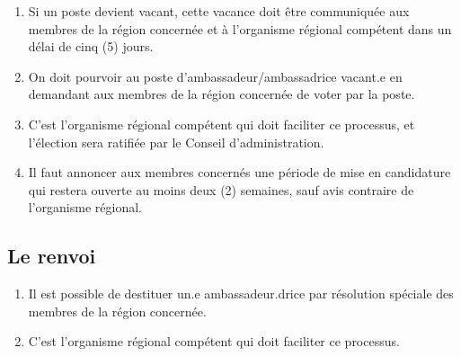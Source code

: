 \begin{enumerate}
 \item
  Si un poste devient vacant, cette vacance doit être communiquée aux membres de la région concernée et à l'organisme régional compétent dans un délai de cinq (5) jours.
 \item
  On doit pourvoir au poste d'ambassadeur/ambassadrice vacant.e en demandant aux membres de la région concernée de voter par la poste.
 \item
  C'est l'organisme régional compétent qui doit faciliter ce processus, et l'élection sera ratifiée par le Conseil d'administration.
 \item
  Il faut annoncer aux membres concernés une période de mise en candidature qui restera ouverte au moins deux (2) semaines, sauf avis contraire de l'organisme régional.
\end{enumerate}

\subsection{Le renvoi}
\label{le-renvoi-1}

\begin{enumerate}
 \item
  Il est possible de destituer un.e ambassadeur.drice par résolution spéciale des membres de la région concernée.
 \item
  C'est l'organisme régional compétent qui doit faciliter ce processus.
\end{enumerate}


